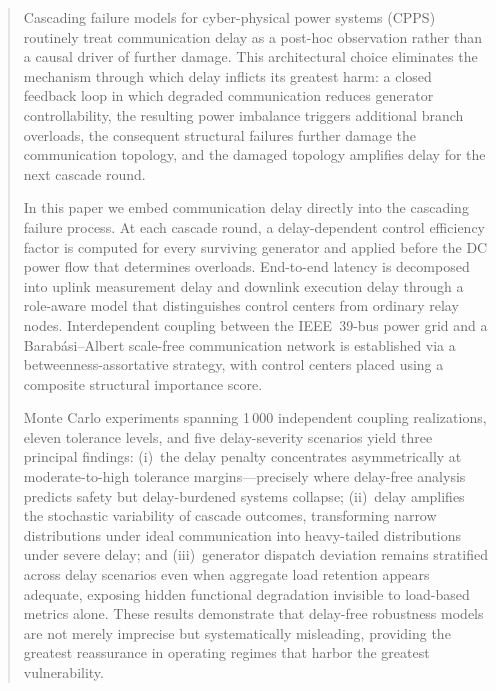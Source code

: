 \documentclass[a4paper,fleqn]{cas-dc}
\begin{document}
\begin{abstract}
Cascading failure models for cyber-physical power systems (CPPS) routinely
treat communication delay as a post-hoc observation rather than a causal
driver of further damage.  This architectural choice eliminates the
mechanism through which delay inflicts its greatest harm: a closed
feedback loop in which degraded communication reduces generator
controllability, the resulting power imbalance triggers additional branch
overloads, the consequent structural failures further damage the
communication topology, and the damaged topology amplifies delay for the
next cascade round.

In this paper we embed communication delay directly into the cascading
failure process.  At each cascade round, a delay-dependent control
efficiency factor is computed for every surviving generator and applied
before the DC power flow that determines overloads.  End-to-end latency
is decomposed into uplink measurement delay and downlink execution delay
through a role-aware model that distinguishes control centers from
ordinary relay nodes.  Interdependent coupling between the IEEE~39-bus
power grid and a Barab\'{a}si--Albert scale-free communication network is
established via a betweenness-assortative strategy, with control centers
placed using a composite structural importance score.

Monte Carlo experiments spanning 1\,000 independent coupling realizations,
eleven tolerance levels, and five delay-severity scenarios yield three
principal findings: (i)~the delay penalty concentrates asymmetrically at
moderate-to-high tolerance margins---precisely where delay-free analysis
predicts safety but delay-burdened systems collapse; (ii)~delay amplifies
the stochastic variability of cascade outcomes, transforming narrow
distributions under ideal communication into heavy-tailed distributions
under severe delay; and (iii)~generator dispatch deviation remains
stratified across delay scenarios even when aggregate load retention
appears adequate, exposing hidden functional degradation invisible to
load-based metrics alone.  These results demonstrate that delay-free
robustness models are not merely imprecise but systematically misleading,
providing the greatest reassurance in operating regimes that harbor the
greatest vulnerability.
\end{abstract}
\end{document}
